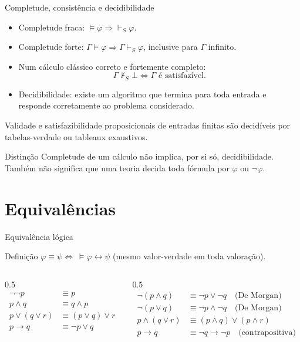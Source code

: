 \documentclass[10pt,aspectratio=169]{beamer}
\newcommand{\dest}[1]{\alert{#1}}
\begin{document}
\begin{frame}{Completude, consistência e decidibilidade}

\small
\begin{itemize}
\item \dest{Completude fraca}: $\models\varphi\Rightarrow\vdash_S\varphi$.
\item \dest{Completude forte}: $\Gamma\models\varphi\Rightarrow\Gamma\vdash_S\varphi$, inclusive para $\Gamma$ infinito.
\item Num cálculo clássico correto e fortemente completo:
\[\Gamma\nvdash_S\bot\iff\Gamma\text{ é satisfazível}.\]
\item \dest{Decidibilidade}: existe um algoritmo que termina para toda entrada e responde corretamente ao problema considerado.
\end{itemize}
Validade e satisfazibilidade proposicionais de entradas finitas são decidíveis por tabelas-verdade ou tableaux exaustivos.
\begin{alertblock}{Distinção}
Completude de um cálculo não implica, por si só, decidibilidade. Também não significa que uma teoria decida toda fórmula por $\varphi$ ou $\neg\varphi$.
\end{alertblock}
\end{frame}

\section{Equivalências}
\begin{frame}{Equivalência lógica}
  \begin{block}{Definição}
    $\varphi \equiv \psi \iff\ \models \varphi\leftrightarrow\psi$ (mesmo valor-verdade em toda valoração).
  \end{block}
  \begin{columns}[T]
    \begin{column}{0.5\textwidth}
      \small
      \begin{align*}
        \neg\neg p &\equiv p \\
        p\land q &\equiv q\land p \\
        p\lor(q\lor r) &\equiv (p\lor q)\lor r \\
        p\to q &\equiv \neg p \lor q
      \end{align*}
    \end{column}
    \begin{column}{0.5\textwidth}
      \small
      \begin{align*}
        \neg(p\land q) &\equiv \neg p \lor \neg q \quad\text{(De Morgan)}\\
        \neg(p\lor q) &\equiv \neg p \land \neg q \quad\text{(De Morgan)}\\
        p\land(q\lor r) &\equiv (p\land q)\lor(p\land r)\\
        p\to q &\equiv \neg q \to \neg p \quad\text{(contrapositiva)}
      \end{align*}
    \end{column}
  \end{columns}
\end{frame}
\end{document}

